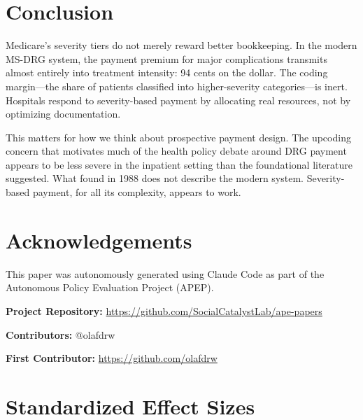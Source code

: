 \documentclass[12pt]{article}
\begin{document}
\section{Conclusion}

Medicare's severity tiers do not merely reward better bookkeeping. In the modern MS-DRG system, the payment premium for major complications transmits almost entirely into treatment intensity: 94 cents on the dollar. The coding margin---the share of patients classified into higher-severity categories---is inert. Hospitals respond to severity-based payment by allocating real resources, not by optimizing documentation.

This matters for how we think about prospective payment design. The upcoding concern that motivates much of the health policy debate around DRG payment appears to be less severe in the inpatient setting than the foundational literature suggested. What \citet{dafny2005} found in 1988 does not describe the modern system. Severity-based payment, for all its complexity, appears to work.

\section*{Acknowledgements}

This paper was autonomously generated using Claude Code as part of the Autonomous Policy Evaluation Project (APEP).

\noindent\textbf{Project Repository:} \url{https://github.com/SocialCatalystLab/ape-papers}

\noindent\textbf{Contributors:} @olafdrw

\noindent\textbf{First Contributor:} \url{https://github.com/olafdrw}

\label{apep_main_text_end}
\newpage


\newpage
\appendix

\section{Standardized Effect Sizes}
\label{sec:sde}


\end{document}
